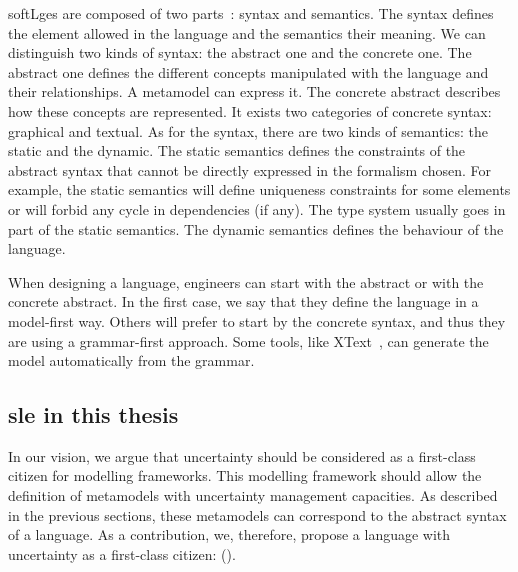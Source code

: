 \Glspl{softLge} are composed of two parts~\cite{DBLP:journals/computer/HarelR04}: syntax and semantics.
The syntax defines the element allowed in the language and the semantics their meaning.
We can distinguish two kinds of syntax: the abstract one and the concrete one.
The abstract one defines the different concepts manipulated with the language and their relationships.
A \gls{metamodel} can express it.
The concrete abstract describes how these concepts are represented.
It exists two categories of concrete syntax: graphical and textual.
As for the syntax, there are two kinds of semantics: the static and the dynamic.
The static semantics defines the constraints of the abstract syntax that cannot be directly expressed in the formalism chosen.
For example, the static semantics will define uniqueness constraints for some elements or will forbid any cycle in dependencies (if any).
The type system usually goes in part of the static semantics.
The dynamic semantics defines the behaviour of the language.

When designing a language, engineers can start with the abstract or with the concrete abstract.
In the first case, we say that they define the language in a \gls{model}-first way.
Others will prefer to start by the concrete syntax, and thus they are using a grammar-first approach.
Some tools, like XText~\cite{DBLP:conf/oopsla/EysholdtB10}, can generate the model automatically from the grammar.
 

	
\subsection[SLE in this thesis]{\gls{sle} in this thesis}

In our vision, we argue that uncertainty should be considered as a first-class citizen for modelling frameworks.
This modelling framework should allow the definition of \glspl{metamodel} with uncertainty management capacities.
As described in the previous sections, these \glspl{metamodel} can correspond to the abstract syntax of a language.
As a contribution, we, therefore, propose a language with uncertainty as a first-class citizen: \langName (\cf {}).